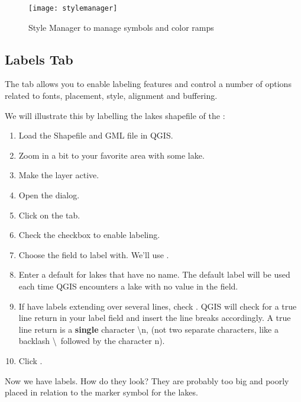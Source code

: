 \begin{figure}[ht]
   \begin{center}
   \caption{Style Manager to manage symbols and color ramps \nixcaption}\label{fig:stylemanager}\smallskip
   \texttt{[image: stylemanager]}
\end{center}
\end{figure}

\subsection{Labels Tab}

The  tab allows you to enable labeling features and control a number of
options related to fonts, placement, style, alignment and buffering.

We will illustrate this by labelling the lakes shapefile of the
:

\begin{enumerate}
\item Load the Shapefile  and GML file  in QGIS.
\item Zoom in a bit to your favorite area with some lake.
\item Make the  layer active.
\item Open the  dialog.
\item Click on the  tab.
\item Check the  checkbox to enable labeling.
\item Choose the field to label with. 
  We'll use .
\item Enter a default for lakes that have no name. The default label will be
  used each time QGIS encounters a lake with no value in the 
field.
\item If have labels extending over several lines, check . QGIS will check for a true line return in your label field and
insert the line breaks accordingly. A true line return is a \textbf{single}
character \textbackslash n, (not two separate characters, like a backlash
\textbackslash ~followed by the character n).
\item Click .
\end{enumerate} 

Now we have labels. How do they look? They are probably too big and poorly
placed in relation to the marker symbol for the lakes.

